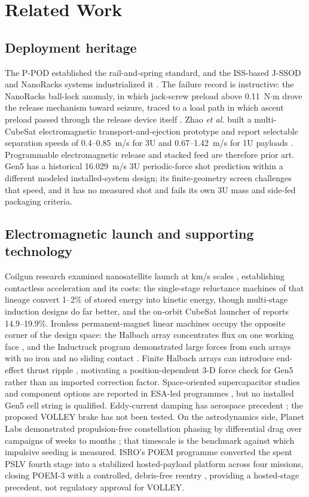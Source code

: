 \documentclass[conference]{IEEEtran}
\begin{document}
\section{Related Work}
\subsection{Deployment heritage}
The P-POD established the rail-and-spring standard, and the ISS-based J-SSOD and NanoRacks systems industrialized it \cite{jssod,soa}. The failure record is instructive: the NanoRacks ball-lock anomaly, in which jack-screw preload above 0.11~N$\cdot$m drove the release mechanism toward seizure, traced to a load path in which ascent preload passed through the release device itself \cite{lewis}. Zhao \emph{et al.} built a multi-CubeSat electromagnetic transport-and-ejection prototype and report selectable separation speeds of 0.4--0.85~m/s for 3U and 0.67--1.42~m/s for 1U payloads \cite{stacked2022}. Programmable electromagnetic release and stacked feed are therefore prior art. Gen5 has a historical 16.029~m/s 3U periodic-force shot prediction within a different modeled installed-system design; its finite-geometry screen challenges that speed, and it has no measured shot and fails its own 3U mass and side-fed packaging criteria.

\subsection{Electromagnetic launch and supporting technology}
Coilgun research examined nanosatellite launch at km/s scales \cite{turman,kaye}, establishing contactless acceleration and its costs: the single-stage reluctance machines of that lineage convert 1--2\% of stored energy into kinetic energy, though multi-stage induction designs do far better, and the on-orbit CubeSat launcher of \cite{feng2025} reports 14.9--19.9\%. Ironless permanent-magnet linear machines occupy the opposite corner of the design space: the Halbach array concentrates flux on one working face \cite{halbach}, and the Inductrack program demonstrated large forces from such arrays with no iron and no sliding contact \cite{inductrack}. Finite Halbach arrays can introduce end-effect thrust ripple \cite{yamaguchi2023}, motivating a position-dependent 3-D force check for Gen5 rather than an imported correction factor. Space-oriented supercapacitor studies and component options are reported in ESA-led programmes \cite{faure,espc}, but no installed Gen5 cell string is qualified. Eddy-current damping has aerospace precedent \cite{eddy}; the proposed VOLLEY brake has not been tested. On the astrodynamics side, Planet Labs demonstrated propulsion-free constellation phasing by differential drag over campaigns of weeks to months \cite{foster,foster2}; that timescale is the benchmark against which impulsive seeding is measured. ISRO's POEM programme converted the spent PSLV fourth stage into a stabilized hosted-payload platform across four missions, closing POEM-3 with a controlled, debris-free reentry \cite{poem3,poem4}, providing a hosted-stage precedent, not regulatory approval for VOLLEY.
\end{document}
